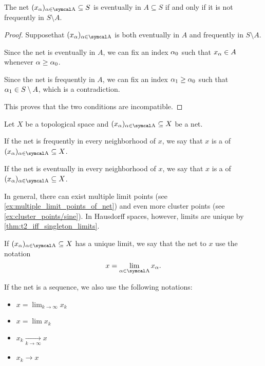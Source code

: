 \begin{proposition}\label{thm:topological_net_eventually_in_iff_not_frequently_in_complement}
  The net \( ( x_\al )_{\al \in \CA} \subseteq S \) is eventually in \( A \subseteq S \) if and only if it is not frequently in \( S \setminus A \).
\end{proposition}
\begin{proof}
  Suppose\LEM that \( ( x_\al )_{\al \in \CA} \) is both eventually in \( A \) and frequently in \( S \setminus A \).

  Since the net is eventually in \( A \), we can fix an index \( \alpha_0 \) such that \( x_\alpha \in A \) whenever \( \alpha \geq \alpha_0 \).

  Since the net is frequently in \( A \), we can fix an index \( \alpha_1 \geq \alpha_0 \) such that \( \alpha_1 \in S \setminus A \), which is a contradiction.

  This proves that the two conditions are incompatible.
\end{proof}

\begin{definition}\label{def:topological_net_convergence}
  Let \( X \) be a topological space and \( (x_\al)_{\al \in \CA} \subseteq X \) be a net.

  \begin{defenum}
     If the net is frequently in every neighborhood of \( x \), we say that \( x \) is a  of \( (x_\al)_{\al \in \CA} \subseteq X \).

     If the net is eventually in every neighborhood of \( x \), we say that \( x \) is a  of \( (x_\al)_{\al \in \CA} \subseteq X \).
  \end{defenum}

  In general, there can exist multiple limit points (see \cref{ex:multiple_limit_points_of_net}) and even more cluster points (see \cref{ex:cluster_points/sine}). In Hausdorff spaces, however, limits are unique by \cref{thm:t2_iff_singleton_limits}.

  If \( (x_\al)_{\al \in \CA} \subseteq X \) has a unique limit, we say that the net  to \( x \) use the notation
  \begin{equation*}
    x = \lim_{\al \in \CA} x_\al.
  \end{equation*}

  If the net is a sequence, we also use the following notations:
  \begin{itemize}
    \item \( x = \lim_{k \to \infty} x_k \)
    \item \( x = \lim x_k \)
    \item \( x_k \xrightarrow[k \to \infty]{} x \)
    \item \( x_k \to x \)
  \end{itemize}
\end{definition}

